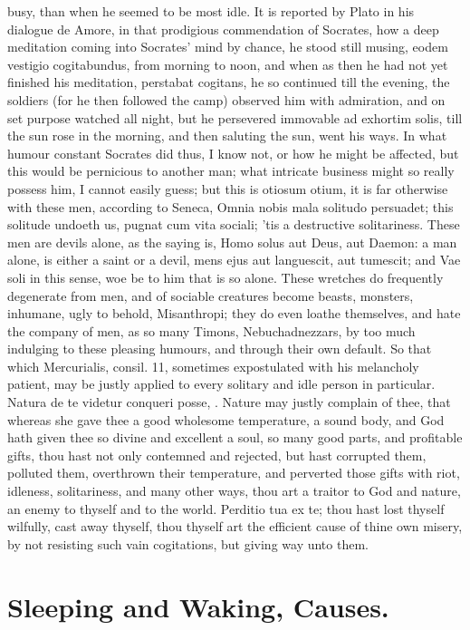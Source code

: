 {{busy, than when he seemed to be most idle. It is reported by Plato in
his dialogue de Amore, in that prodigious commendation of Socrates, how
a deep meditation coming into Socrates' mind by chance, he stood still
musing, eodem vestigio cogitabundus, from morning to noon, and when as
then he had not yet finished his meditation, perstabat cogitans, he so
continued till the evening, the soldiers (for he then followed the
camp) observed him with admiration, and on set purpose watched all
night, but he persevered immovable ad exhortim solis, till the sun rose
in the morning, and then saluting the sun, went his ways. In what
humour constant Socrates did thus, I know not, or how he might be
affected, but this would be pernicious to another man; what intricate
business might so really possess him, I cannot easily guess; but this
is otiosum otium, it is far otherwise with these men, according to
Seneca, Omnia nobis mala solitudo persuadet; this solitude undoeth us,
pugnat cum vita sociali; 'tis a destructive solitariness. These men are
devils alone, as the saying is, Homo solus aut Deus, aut Daemon: a man
alone, is either a saint or a devil, mens ejus aut languescit, aut
tumescit; and Vae soli in this sense, woe be to him that is so
alone. These wretches do frequently degenerate from men, and of
sociable creatures become beasts, monsters, inhumane, ugly to behold,
Misanthropi; they do even loathe themselves, and hate the company of
men, as so many Timons, Nebuchadnezzars, by too much indulging to these
pleasing humours, and through their own default. So that which
Mercurialis, consil. 11, sometimes expostulated with his melancholy
patient, may be justly applied to every solitary and idle person in
particular. Natura de te videtur conqueri posse, \etc{}. Nature may
justly complain of thee, that whereas she gave thee a good wholesome
temperature, a sound body, and God hath given thee so divine and
excellent a soul, so many good parts, and profitable gifts, thou hast
not only contemned and rejected, but hast corrupted them, polluted
them, overthrown their temperature, and perverted those gifts with
riot, idleness, solitariness, and many other ways, thou art a traitor
to God and nature, an enemy to thyself and to the world. Perditio tua
ex te; thou hast lost thyself wilfully, cast away thyself, thou thyself
art the efficient cause of thine own misery, by not resisting such vain
cogitations, but giving way unto them.

\section{Sleeping and Waking, Causes.}

}}
